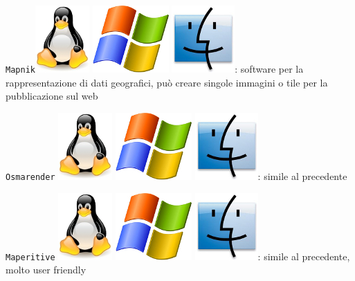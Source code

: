 \documentclass[a4paper,twoside,12pt,]{article}
\newcommand{\soft}[1]{\texttt{#1}}
\begin{document}
\soft{Mapnik}\includegraphics{./linux-logo.jpg} \includegraphics{./windows-logo.jpg} \includegraphics{./mac-logo.jpg}: software per la rappresentazione di dati geografici, può creare singole immagini o tile per la pubblicazione sul web 

\soft{Osmarender} \includegraphics{./linux-logo.jpg} \includegraphics{./windows-logo.jpg} \includegraphics{./mac-logo.jpg}: simile al precedente

\soft{Maperitive} \includegraphics{./linux-logo.jpg} \includegraphics{./windows-logo.jpg} \includegraphics{./mac-logo.jpg}: simile al precedente, molto user friendly
\end{document}
